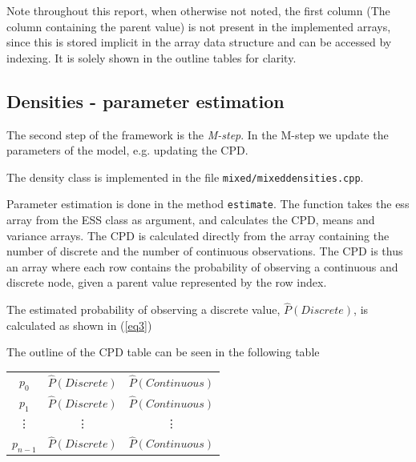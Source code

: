 \documentclass[10pt, journal, compsoc, a4paper]{IEEEtran}
\begin{document}
Note throughout this report, when otherwise not noted, the first column (The column containing the parent value) is not present in the implemented arrays, since this is stored implicit in the array data structure and can be accessed by indexing. It is solely shown in the outline tables for clarity. 


\subsection{Densities - parameter estimation} %
\label{sub:densities}
The second step of the framework is the \emph{M-step}. In the M-step we update the parameters of the model, e.g. updating the CPD.

The density class is implemented in the file \texttt{mixed/mixeddensities.cpp}. 

Parameter estimation is done in the method \texttt{estimate}. The function takes the ess array from the ESS class as argument, and calculates the CPD, means and variance arrays. The CPD is calculated directly from the array containing the number of discrete and the number of continuous observations. The CPD is thus an array where each row contains the probability of observing a continuous and discrete node, given a parent value represented by the row index. 

The estimated probability of observing a discrete value, $\hat{P}(Discrete)$, is calculated as shown in (\ref{eq3}) 

The outline of the CPD table can be seen in the following table 

\begin{center}
  \begin{tabular}{c | c | c}
  $p_0$ & $\hat{P}(Discrete)$ & $\hat{P}(Continuous)$\\
  $p_1$ & $\hat{P}(Discrete)$ & $\hat{P}(Continuous)$\\
  \vdots & \vdots & \vdots \\
  $p_{n-1}$ & $\hat{P}(Discrete)$ & $\hat{P}(Continuous)$ 
  \end{tabular}  
\end{center}
\end{document}
